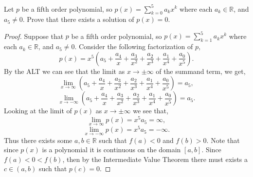 \documentclass[12pt]{article}
\makeatletter
\theoremstyle{homework}
\newenvironment{exercise}[1]
{\def\@currentlabel{#1}\exercisecore}
{\endexercisecore}
\newcommand{\Reals}{\ensuremath{\mathbb R}}
\makeatother
\begin{document}
\begin{exercise}{3} Let $p$ be a fifth order polynomial, so $p(x) = \sum_{k = 0}^5 a_kx^k$ where each 
  $a_k \in \Reals$, and $a_5 \neq 0$. Prove that there exists a solution of $p(x) = 0$.\\

  \begin{proof}
    Suppose that $p$ be a fifth order polynomial, so $p(x) = \sum_{k = 1}^5 a_kx^k$ where each 
    $a_k \in \Reals$, and $a_5 \neq 0$. Consider the following factorization of $p$,
    \begin{equation*}
      p(x) = x^{5}(a_5 + \frac{a_4}{x} + \frac{a_3}{x^2} + \frac{a_2}{x^3} + \frac{a_1}{x^4} + \frac{a_0}{x^5}).
    \end{equation*}
    By the ALT we can see that the limit as $x \to \pm \infty$ of the summand term, we get,
    \begin{equation*}
      \lim_{x \to \infty} (a_5 + \frac{a_4}{x} + \frac{a_3}{x^2} + \frac{a_2}{x^3} + \frac{a_1}{x^4} + \frac{a_0}{x^5}) = a_5,
    \end{equation*}
    \begin{equation*}
      \lim_{x \to -\infty} (a_5 + \frac{a_4}{x} + \frac{a_3}{x^2} + \frac{a_2}{x^3} + \frac{a_1}{x^4} + \frac{a_0}{x^5}) = a_5.
    \end{equation*}
    Looking at the limit of $p(x)$ as $x \to \pm \infty$ we see that,
    \begin{equation*}
      \lim_{x \to \infty} p(x) = x^{5} a_5 = \infty,
    \end{equation*}
    \begin{equation*}
      \lim_{x \to -\infty} p(x) = x^{5} a_5 = -\infty. 
    \end{equation*}
    Thus there exists some $a, b \in \Reals$ such that $f(a)<0$ and $f(b)>0$. Note that since $p(x)$ is a polynomial 
    it is continuous on the domain $[a,b]$. Since $f(a)<0<f(b)$, then by the Intermediate Value Theorem there must exists a $c \in (a,b)$
    such that $p(c) = 0$. 
  \end{proof}

\end{exercise}
\vspace{.5in}
\end{document}
